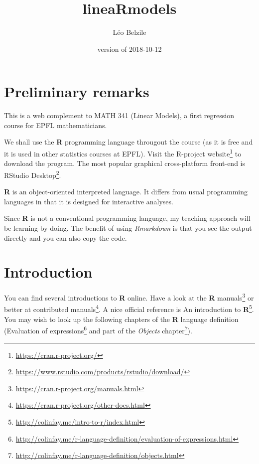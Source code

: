 \documentclass[]{book}
\title{lineaRmodels}
\author{Léo Belzile}
\date{version of 2018-10-12}
\let\rmarkdownfootnote\footnote%
\def\footnote{\protect\rmarkdownfootnote}
\renewcommand{\href}[2]{#2\footnote{\url{#1}}}
\theoremstyle{definition}
\theoremstyle{definition}
\theoremstyle{definition}
\theoremstyle{remark}
\begin{document}
\maketitle

{
\setcounter{tocdepth}{1}
\tableofcontents
}
\chapter*{Preliminary remarks}\label{preliminary-remarks}

This is a web complement to MATH 341 (Linear Models), a first regression
course for EPFL mathematicians.

We shall use the \textbf{R} programming language througout the course
(as it is free and it is used in other statistics courses at EPFL).
Visit \href{https://cran.r-project.org/}{the R-project website} to
download the program. The most popular graphical cross-platform
front-end is
\href{https://www.rstudio.com/products/rstudio/download/}{RStudio
Desktop}.

\textbf{R} is an object-oriented interpreted language. It differs from
usual programming languages in that it is designed for interactive
analyses.

Since \textbf{R} is not a conventional programming language, my teaching
approach will be learning-by-doing. The benefit of using
\emph{Rmarkdown} is that you see the output directly and you can also
copy the code.

\chapter{Introduction}\label{introduction}

\newcommand{\bs}[1]{\boldsymbol{#1}}
\newcommand{\Hmat}{\mathbf{H}}
\newcommand{\Mmat}{\mathbf{M}}
\newcommand{\mX}{\mathbf{X}}
\newcommand{\bX}{{\mathbf{X}}}
\newcommand{\bx}{{\mathbf{x}}}
\newcommand{\by}{{\boldsymbol{y}}}
\newcommand{\bY}{{\boldsymbol{Y}}}
\newcommand{\eps}{\varepsilon}
\newcommand{\beps}{\boldsymbol{\varepsilon}}
\newcommand{\bbeta}{\boldsymbol{\beta}}
\newcommand{\hbb}{\hat{\boldsymbol{\beta}}}
\newcommand{\limni}{\lim_{n \ra \infty}}
\newcommand{\Sp}{\mathsf{span}}


You can find several introductions to \textbf{R} online. Have a look at
the \href{https://cran.r-project.org/manuals.html}{\textbf{R} manuals}
or better at
\href{https://cran.r-project.org/other-docs.html}{contributed manuals}.
A nice official reference is
\href{http://colinfay.me/intro-to-r/index.html}{An introduction to
\textbf{R}}. You may wish to look up the following chapters of the
\textbf{R} language definition
(\href{http://colinfay.me/r-language-definition/evaluation-of-expressions.html}{Evaluation
of expressions} and part of the
\href{http://colinfay.me/r-language-definition/objects.html}{\emph{Objects}
chapter}).
\end{document}
